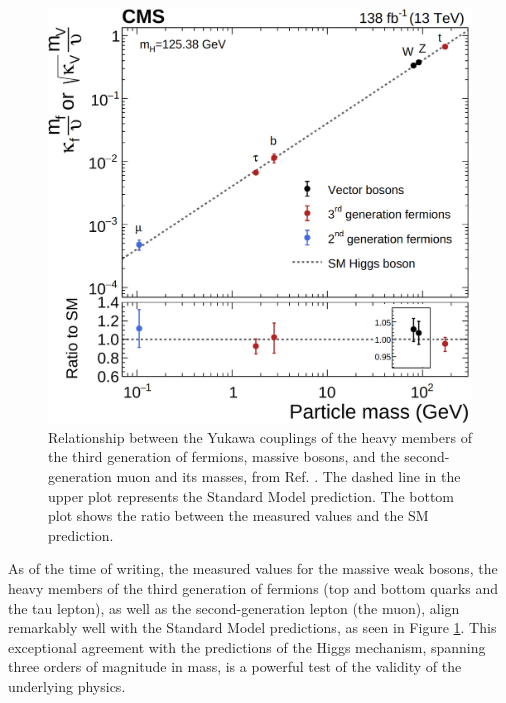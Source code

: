 \begin{figure}[!ht]
    \vspace*{-0.0cm}
    \centering
    \setlength{\mylength}{\textwidth}
    \includegraphics[width=0.60\mylength]{resources/Yukawa_couplings.png}
    \vspace*{-0.0cm}
    \caption{Relationship between the Yukawa couplings of the heavy members of the third generation of fermions, massive bosons, and the second-generation muon and its masses, from Ref. \cite{CMS:2022dwd}. The dashed line in the upper plot represents the Standard Model prediction. The bottom plot shows the ratio between the measured values and the SM prediction.}
    \label{fig:Yukawa_couplings}
    \vspace*{-0.0cm}
\end{figure}

As of the time of writing, the measured values for the massive weak bosons, the heavy members of the third generation of fermions (top and bottom quarks and the tau lepton), as well as the second-generation lepton (the muon), align remarkably well with the Standard Model predictions, as seen in Figure \ref{fig:Yukawa_couplings}. This exceptional agreement with the predictions of the Higgs mechanism, spanning three orders of magnitude in mass, is a powerful test of the validity of the underlying physics.

